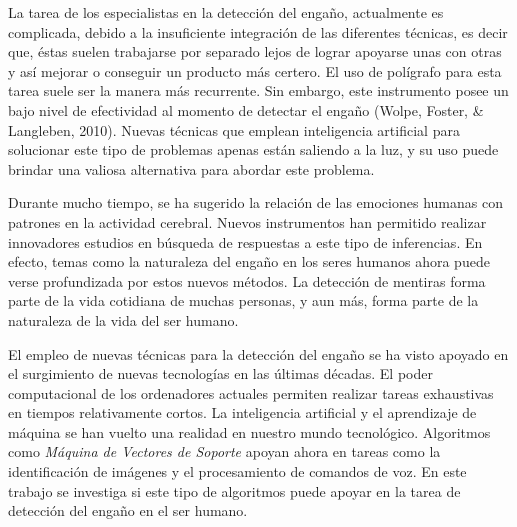 La tarea de los especialistas en la detección del engaño, actualmente es complicada, debido a la insuficiente integración de las diferentes técnicas, es decir que, éstas suelen trabajarse por separado lejos de lograr apoyarse unas con otras y así mejorar o conseguir un producto más certero. El uso de polígrafo para esta tarea suele ser la manera más recurrente. Sin embargo, este instrumento posee un bajo nivel de efectividad al momento de detectar el engaño (Wolpe, Foster, \& Langleben, 2010). Nuevas técnicas que emplean inteligencia artificial para solucionar este tipo de problemas apenas están saliendo a la luz, y su uso puede brindar una valiosa alternativa para abordar este problema.

Durante mucho tiempo, se ha sugerido la relación de las emociones humanas con patrones en la actividad cerebral. Nuevos instrumentos han permitido realizar innovadores estudios en búsqueda de respuestas a este tipo de inferencias. En efecto, temas como la naturaleza del engaño en los seres humanos ahora puede verse profundizada por estos nuevos métodos. La detección de mentiras forma parte de la vida cotidiana de muchas personas, y aun más, forma parte de la naturaleza de la vida del ser humano.

El empleo de nuevas técnicas para la detección del engaño se ha visto apoyado en el surgimiento de nuevas tecnologías en las últimas décadas. El poder computacional de los ordenadores actuales permiten realizar tareas exhaustivas en tiempos relativamente cortos. La inteligencia artificial y el aprendizaje de máquina se han vuelto una realidad en nuestro mundo tecnológico. Algoritmos como \textit{Máquina de Vectores de Soporte} apoyan ahora en tareas como la identificación de imágenes y el procesamiento de comandos de voz. En este trabajo se investiga si este tipo de algoritmos puede apoyar en la tarea de detección del engaño en el ser humano.